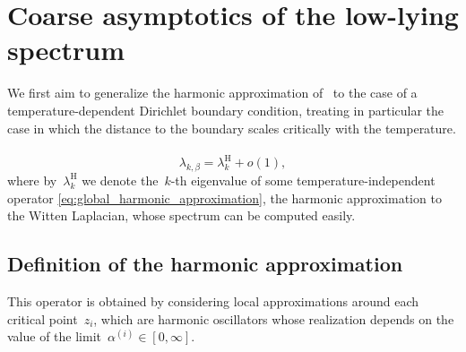 \documentclass[10pt]{article}
\newcommand{\cL}{\mathcal{L}}
\newcommand{\R}{\mathbb{R}}
\newcommand{\1}{\mathbbm 1}
\newcommand{\epsLimit}[1]{\alpha^{(#1)}} %
\newtheorem{definition}{Definition}
\begin{document}

    \section{Coarse asymptotics of the low-lying spectrum}
    We first aim to generalize the harmonic approximation of~\cite{S83} to the case of a temperature-dependent Dirichlet boundary condition, treating in particular the case in which the distance to the boundary scales critically with the temperature.
   ~$$\lambda_{k,\beta} = \lambda_{k}^{\mathrm H} + o(1),$$
    where by~$\lambda_k^{\mathrm H}$ we denote the~$k$-th eigenvalue of some temperature-independent operator \eqref{eq:global_harmonic_approximation}, the harmonic approximation to the Witten Laplacian, whose spectrum can be computed easily.

    \subsection{Definition of the harmonic approximation}
    This operator is obtained by considering local approximations around each critical point~$z_i$, which are harmonic oscillators whose realization depends on the value of the limit~$\epsLimit{i} \in [0,\infty]$.
\end{document}
